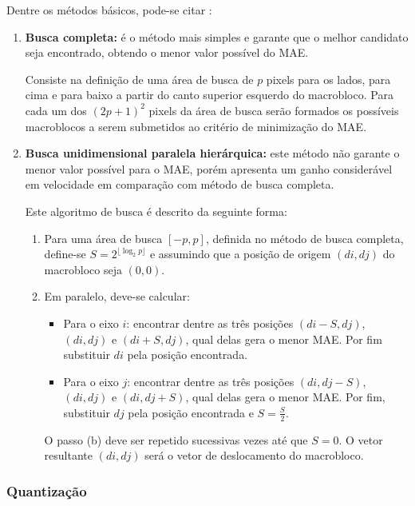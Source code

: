 Dentre os métodos básicos, pode-se citar \cite{Bhaskaran:1997:IVC:549617}:
\begin{enumerate}
\item {\bf Busca completa:} é o método mais simples e garante que o melhor candidato seja encontrado, obtendo o menor valor possível do MAE.

Consiste na definição de uma área de busca de $ p $ pixels para os lados, para cima e para baixo a partir do canto superior esquerdo do macrobloco. Para cada um dos $ (2p+1)^2 $ pixels da área de busca serão formados os possíveis macroblocos a serem submetidos ao critério de minimização do MAE.

\item {\bf Busca unidimensional paralela hierárquica:} este método não garante o menor valor possível para o MAE, porém apresenta um ganho considerável em velocidade em comparação com método de busca completa.

Este algoritmo de busca é descrito da seguinte forma:
\begin{enumerate}
\item Para uma área de busca $ [-p,p] $, definida no método de busca completa, define-se $ S = 2^{\lfloor \log_{2}p \rfloor} $ e assumindo que a posição de origem $ (di,dj) $ do macrobloco seja $ (0,0) $.
\item Em paralelo, deve-se calcular:
\begin{itemize}
\item Para o eixo $ i $: encontrar dentre as três posições $ (di-S,dj) $, $ (di,dj) $ e $ (di+S,dj) $, qual delas gera o menor MAE. Por fim substituir $ di $ pela posição encontrada.
\item Para o eixo $ j $: encontrar dentre as três posições $ (di,dj-S) $, $ (di,dj) $ e $ (di,dj+S) $, qual delas gera o menor MAE. Por fim, substituir $ dj $ pela posição encontrada e $ S = \frac{S}{2}. $
\end{itemize}

O passo (b) deve ser repetido sucessivas vezes até que $ S=0 $. O vetor resultante $ (di,dj) $ será o vetor de deslocamento do macrobloco.
\end{enumerate}

\end{enumerate}

\subsubsection{Quantização}
\label{mpeg_quantization}

